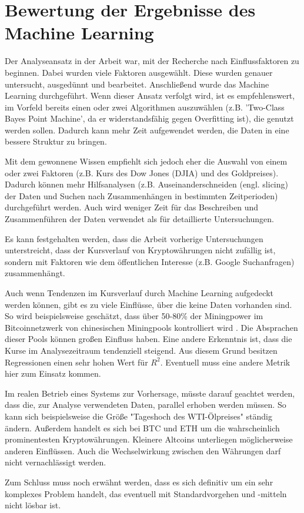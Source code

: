 \section{Bewertung der Ergebnisse des Machine Learning}\label{sec:BewertungML}
Der Analyseansatz in der Arbeit war, mit der Recherche nach Einflussfaktoren zu beginnen. Dabei wurden viele Faktoren ausgewählt. Diese wurden genauer untersucht, ausgedünnt und bearbeitet. Anschließend wurde das Machine Learning durchgeführt. Wenn dieser Ansatz verfolgt wird, ist es empfehlenswert, im Vorfeld bereits einen oder zwei Algorithmen auszuwählen (z.B. 'Two-Class Bayes Point Machine', da er widerstandsfähig gegen Overfitting ist), die genutzt werden sollen. Dadurch kann mehr Zeit aufgewendet werden, die Daten in eine bessere Struktur zu bringen.\par
Mit dem gewonnene Wissen empfiehlt sich jedoch eher die Auswahl von einem oder zwei Faktoren (z.B. Kurs des Dow Jones (DJIA) und des Goldpreises). Dadurch können mehr Hilfsanalysen (z.B. Auseinanderschneiden (engl. slicing) der Daten und Suchen nach Zusammenhängen in bestimmten Zeitperioden) durchgeführt werden. Auch wird weniger Zeit für das Beschreiben und Zusammenführen der Daten verwendet als für detaillierte Untersuchungen.\par
Es kann festgehalten werden, dass die Arbeit vorherige Untersuchungen unterstreicht, dass der Kursverlauf von Kryptowährungen nicht zufällig ist, sondern mit Faktoren wie dem öffentlichen Interesse (z.B. Google Suchanfragen) zusammenhängt.\par
Auch wenn Tendenzen im Kursverlauf durch Machine Learning aufgedeckt werden können, gibt es zu viele Einflüsse, über die keine Daten vorhanden sind. So wird beispielsweise geschätzt, dass über 50-80\% der Miningpower im Bitcoinnetzwerk von chinesischen Miningpools kontrolliert wird . Die Absprachen dieser Pools können großen Einfluss haben. 
Eine andere Erkenntnis ist, dass die Kurse im Analysezeitraum tendenziell steigend. Aus diesem Grund besitzen Regressionen einen sehr hohen Wert für $ R^2 $. Eventuell muss eine andere Metrik hier zum Einsatz kommen.\par
Im realen Betrieb eines Systems zur Vorhersage, müsste darauf geachtet werden, dass die, zur Analyse verwendeten Daten, parallel erhoben werden müssen. So kann sich beispielsweise die Größe "Tageshoch des WTI-Ölpreises" ständig ändern. Außerdem handelt es sich bei BTC und ETH um die wahrscheinlich prominentesten Kryptowährungen. Kleinere Altcoins unterliegen möglicherweise anderen Einflüssen. Auch die Wechselwirkung zwischen den Währungen darf nicht vernachlässigt werden.\par
Zum Schluss muss noch erwähnt werden, dass es sich definitiv um ein sehr komplexes Problem handelt, das eventuell mit Standardvorgehen und -mitteln nicht lösbar ist.